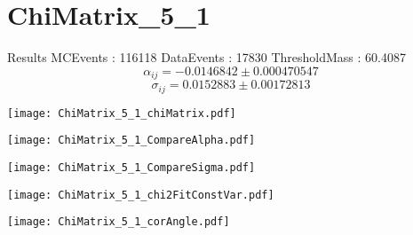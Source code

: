 \documentclass[a4paper,12pt]{article}
\begin{document}
\section{ChiMatrix\_5\_1}
\begin{minipage}{0.49\linewidth} Results \newline
MCEvents : 116118\newline
DataEvents : 17830 \newline
ThresholdMass : 60.4087\\
$$\alpha_{ij} = -0.0146842\pm 0.000470547$$
$$\sigma_{ij} = 0.0152883\pm 0.00172813$$
\end{minipage}\hfill
\begin{minipage}{0.49\linewidth} 
\texttt{[image: ChiMatrix\_5\_1\_chiMatrix.pdf]}\\
\end{minipage}
\hfill
\begin{minipage}{0.49\linewidth} 
\texttt{[image: ChiMatrix\_5\_1\_CompareAlpha.pdf]}\\
\end{minipage}
\hfill
\begin{minipage}{0.49\linewidth} 
\texttt{[image: ChiMatrix\_5\_1\_CompareSigma.pdf]}\\
\end{minipage}
\begin{minipage}{0.49\linewidth} 
\texttt{[image: ChiMatrix\_5\_1\_chi2FitConstVar.pdf]}\\
\end{minipage}
\hfill
\begin{minipage}{0.49\linewidth} 
\texttt{[image: ChiMatrix\_5\_1\_corAngle.pdf]}\\
\end{minipage}
\end{document}
